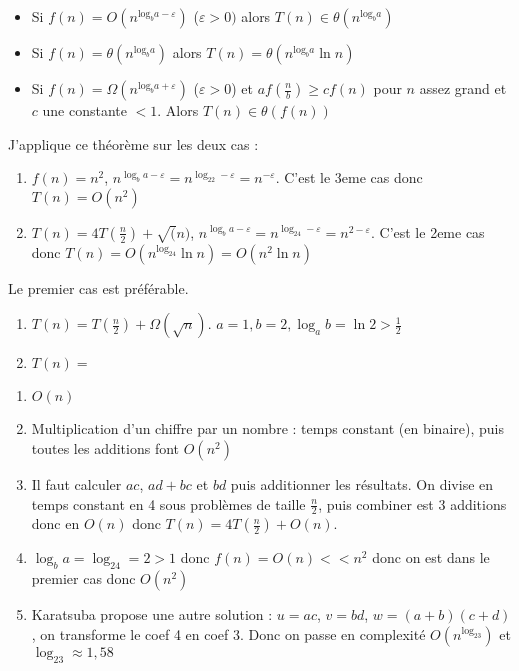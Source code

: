 \begin{itemize}
	\item Si $f(n) = O(n^{\mathrm{log}_ba-\varepsilon})$ ($\varepsilon > 0)$ alors $T(n)\in \theta(n^{\mathrm{log}_ba})$
	\item Si $f(n) = \theta(n^{\mathrm{log}_ba})$ alors $T(n) = \theta(n^{\mathrm{log}_ba}\ln n)$
	\item Si $f(n) = \Omega(n^{\mathrm{log}_ba+\varepsilon})$ ($\varepsilon > 0$) et $af(\frac{n}{b}) \geq cf(n)$ pour $n$ assez grand et $c$ une constante $< 1$. Alors $T(n) \in \theta(f(n))$
\end{itemize}

J'applique ce théorème sur les deux cas : \\
\begin{enumerate}
	\item $f(n) = n^2$, $n^{\log_ba-\varepsilon} = n^{\log_22 - \varepsilon} = n^{- \varepsilon}$. C'est le 3eme cas donc $T(n) = O(n^2)$
	\item $T(n) = 4T(\frac{n}{2}) + \sqrt(n)$, $n^{\log_ba-\varepsilon} = n^{\log_24 - \varepsilon} = n^{2 - \varepsilon}$. C'est le 2eme cas donc $T(n) = O(n^{\log_24}\ln n) = O(n^2\ln n)$
\end{enumerate}
Le premier cas est préférable.\\

\begin{enumerate}
	\item $T(n) = T(\frac{n}{2}) + \Omega(\sqrt{n})$. $a=1, b=2, \log_ab = \ln 2 > \frac{1}{2}$
	\item $T(n) = $
\end{enumerate}

\begin{enumerate}
	\item $O(n)$
	\item Multiplication d'un chiffre par un nombre : temps constant (en binaire), puis toutes les additions font $O(n^2)$
	\item Il faut calculer $ac$, $ad + bc$ et $bd$ puis additionner les résultats. On divise en temps constant en 4 sous problèmes de taille $\frac{n}{2}$, puis combiner est 3 additions donc en $O(n)$ donc $T(n) = 4T(\frac{n}{2}) + O(n)$.
	\item $\log_ba = \log_24 = 2 > 1$ donc $f(n) = O(n) << n^2$ donc on est dans le premier cas donc $O(n^2)$
	\item Karatsuba propose une autre solution : $u = ac$, $v = bd$, $w = (a+b)(c+d)$, on transforme le coef 4 en coef 3. Donc on passe en complexité $O(n^{\log_23})$ et $\log_23 \approx 1,58$
\end{enumerate}


